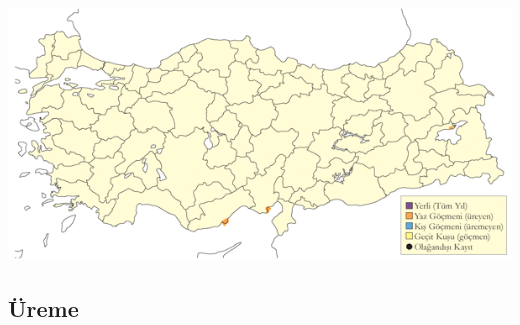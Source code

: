 \documentclass[
  letterpaper,
  DIV=11,
  numbers=noendperiod]{scrreprt}
\begin{document}
\includegraphics{images/harita_Page_021.png}

\hypertarget{uxfcreme-20}{%
\subsection{\texorpdfstring{\textbf{Üreme}}{Üreme}}\label{uxfcreme-20}}
\end{document}
